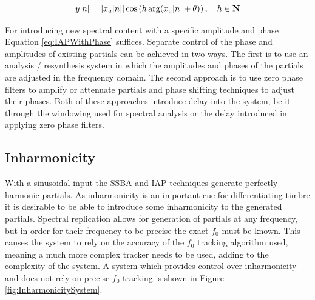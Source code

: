 		\begin{equation}
			y[n] = \left|x_{a}[n]\right| \cos \left( h\arg(x_{a}[n] + \theta) \right), \quad h \in \textbf{N}
			\label{eq:IAPWithPhase}
		\end{equation}

		For introducing new spectral content with a specific amplitude and phase Equation \ref{eq:IAPWithPhase}
		suffices. Separate control of the phase and amplitudes of existing partials can be achieved in two ways.
		The first is to use an analysis / resynthesis system in which the amplitudes and phases of the partials are
		adjusted in the frequency domain. The second approach is to use zero phase filters to amplify or attenuate
		partials and phase shifting techniques to adjust their phases. Both of these approaches introduce delay
		into the system, be it through the windowing used for spectral analysis or the delay introduced in applying
		zero phase filters.

	\subsection{Inharmonicity}
	\label{sec:FeatureControl-Systems-Inharmonicity}
		With a sinusoidal input the SSBA and IAP techniques generate perfectly harmonic partials. As inharmonicity
		is an important cue for differentiating timbre it is desirable to be able to introduce some inharmonicity
		to the generated partials. Spectral replication allows for generation of partials at any frequency, but in
		order for their frequency to be precise the exact $f_{0}$ must be known. This causes the system to rely on
		the accuracy of the $f_{0}$ tracking algorithm used, meaning a much more complex tracker needs to be used,
		adding to the complexity of the system. A system which provides control over inharmonicity and does not
		rely on precise $f_{0}$ tracking is shown in Figure \ref{fig:InharmonicitySystem}.

